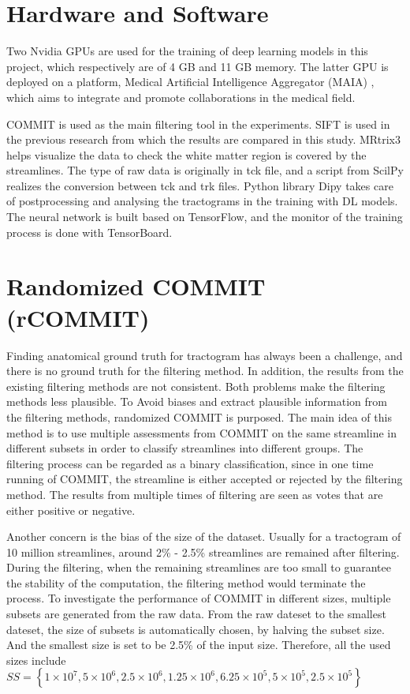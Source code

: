 \section{Hardware and Software}
Two Nvidia GPUs are used for the training of deep learning models in this project, which respectively are of 4 GB and 11 GB memory. 
The latter GPU is deployed on a platform, Medical Artificial Intelligence Aggregator (MAIA) \cite{MAIA}, which aims to integrate and promote collaborations in the medical field.

COMMIT \cite{daducciCOMMITConvexOptimization2015} is used as the main filtering tool in the experiments. 
SIFT \cite{smithSIFTSphericaldeconvolutionInformed2013} is used in the previous research from which the results are compared in this study.
MRtrix3 \cite{tournierMRtrix3FastFlexible2019} helps visualize the data to check the white matter region is covered by the streamlines. 
The type of raw data is originally in tck file, and a script from ScilPy realizes the conversion between tck and trk files.
Python library Dipy takes care of postprocessing and analysing the tractograms in the training with DL models.
The neural network is built based on TensorFlow, and the monitor of the training process is done with TensorBoard.

\section{Randomized COMMIT (rCOMMIT)}
Finding anatomical ground truth for tractogram has always been a challenge, and there is no ground truth for the filtering method.
In addition, the results from the existing filtering methods are not consistent. Both problems make the filtering methods less plausible.
To Avoid biases and extract plausible information from the filtering methods, randomized COMMIT is purposed. 
The main idea of this method is to use multiple assessments from COMMIT on the same streamline in different subsets in order to classify streamlines into different groups.
The filtering process can be regarded as a binary classification, since in one time running of COMMIT, the streamline is either accepted or rejected by the filtering method.
The results from multiple times of filtering are seen as votes that are either positive or negative.

Another concern is the bias of the size of the dataset. Usually for a tractogram of 10 million streamlines, around 2\% - 2.5\% streamlines are remained after filtering.
During the filtering, when the remaining streamlines are too small to guarantee the stability of the computation, the filtering method would terminate the process.
To investigate the performance of COMMIT in different sizes, 
multiple subsets are generated from the raw data. From the raw dateset to the smallest dateset, the size of subsets is automatically chosen, by halving
the subset size. And the smallest size is set to be 2.5\% of the input size. Therefore, all the used sizes include $SS= \left \{  1\times 10^7, 5\times 10^6, 2.5\times 10^6, 1.25\times 10^6, 6.25\times 10^5, 5\times 10^5, 2.5\times 10^5 \right \}$ 


